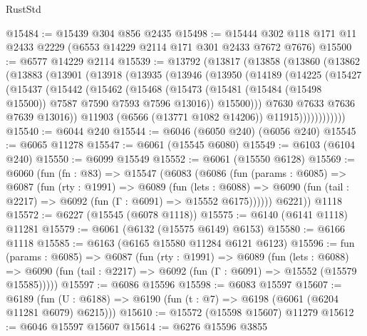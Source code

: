\begin{lexlean}{RustStd}
\begin{coremodule}
{\begin{coremodule}
{{{{{{{{{{{{{{{{{{{{{{{{{{@15484 := @15439 @304 @856 @2435
@15498 := @15444 @302 @118 @171 @11 @2433 @2229 (@6553 @14229 @2114 @171 @301 @2433 @7672 @7676)
@15500 := @6577 @14229 @2114
@15539 := @13792
    (@13817
      (@13858
        (@13860
          (@13862
            (@13883
              (@13901
                (@13918
                  (@13935
                    (@13946
                      (@13950
                        (@14189
                          (@14225
                            (@15427
                              (@15437
                                (@15442
                                  (@15462
                                    (@15468
                                      (@15473
                                        (@15481
                                          (@15484 (@15498 @15500))
                                          @7587
                                          @7590
                                          @7593
                                          @7596
                                          @13016))
                                      @15500)))
                                @7630
                                @7633
                                @7636
                                @7639
                                @13016))
                            @11903
                            (@6566 (@13771 @1082 @14206))
                            @11915))))))))))))
@15540 := @6044 @240
@15544 := @6046 (@6050 @240) (@6056 @240)
@15545 := @6065 @11278
@15547 := @6061 (@15545 @6080)
@15549 := @6103 (@6104 @240)
@15550 := @6099 @15549
@15552 := @6061 (@15550 @6128)
@15569 := @6060
    (fun (fn : @83) =>
    @15547
      (@6083
        (@6086
          (fun (params : @6085) =>
          @6087
            (fun (rty : @1991) =>
            @6089
              (fun (lets : @6088) =>
              @6090 (fun (tail : @2217) => @6092 (fun (Γ : @6091) => @15552 @6175))))))
        @6221))
    @1118
@15572 := @6227 (@15545 (@6078 @1118))
@15575 := @6140 (@6141 @1118) @11281
@15579 := @6061 (@6132 (@15575 @6149) @6153)
@15580 := @6166 @1118
@15585 := @6163 (@6165 @15580 @11284 @6121 @6123)
@15596 := fun (params : @6085) =>
  @6087
    (fun (rty : @1991) =>
    @6089
      (fun (lets : @6088) =>
      @6090 (fun (tail : @2217) => @6092 (fun (Γ : @6091) => @15552 (@15579 @15585)))))
@15597 := @6086 @15596
@15598 := @6083 @15597
@15607 := @6189
    (fun (U : @6188) => @6190 (fun (t : @7) => @6198 (@6061 (@6204 @11281 @6079) @6215)))
@15610 := @15572 (@15598 @15607) @11279
@15612 := @6046 @15597 @15607
@15614 := @6276 @15596 @3855
}}}}}}}}}}}}}}}}}}}}}}}}}}
\end{coremodule}}
\end{coremodule}
\end{lexlean}
